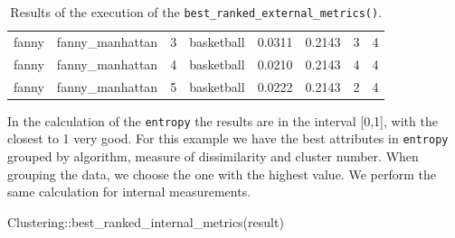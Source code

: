 \documentclass[
]{article}
\newenvironment{Shaded}{\begin{snugshade}}{\end{snugshade}}
\newcommand{\FunctionTok}[1]{\textcolor[rgb]{0.00,0.00,0.00}{#1}}
\newcommand{\NormalTok}[1]{#1}
\newcommand{\SpecialCharTok}[1]{\textcolor[rgb]{0.00,0.00,0.00}{#1}}
\begin{document}
\begin{table}[h!]
\begin{tabular}{| p{1.3cm} | p{2.1cm} | p{0.9cm} | p{1.1cm} | p{1.6cm} | p{0.8cm} | p{2.1cm} | p{1.5cm} |}
\cline{2-8}
\scriptsize fanny      & \scriptsize fanny\_manhattan & \scriptsize     3     & \scriptsize basketball  & \scriptsize     0.0311    & \scriptsize 0.2143 &  \scriptsize        3        & \scriptsize      4 \\
\scriptsize fanny      & \scriptsize fanny\_manhattan & \scriptsize     4     & \scriptsize basketball  & \scriptsize     0.0210    & \scriptsize 0.2143 &  \scriptsize        4        & \scriptsize      4 \\
\scriptsize fanny      & \scriptsize fanny\_manhattan & \scriptsize     5     & \scriptsize basketball  & \scriptsize     0.0222    & \scriptsize 0.2143 &  \scriptsize        2        & \scriptsize      4 \\
\hline
\end{tabular}
\caption{Results of the execution of the \texttt{best\_ranked\_external\_metrics()}.}
\label{tab:clusteringbestrankedexternalmetrics}
\end{table}

In the calculation of the \texttt{entropy} the results are in the
interval {[}0,1{]}, with the closest to 1 very good. For this example we
have the best attributes in \texttt{entropy} grouped by algorithm,
measure of dissimilarity and cluster number. When grouping the data, we
choose the one with the highest value. We perform the same calculation
for internal measurements.

\begin{Shaded}
\begin{Highlighting}[]
\NormalTok{Clustering}\SpecialCharTok{::}\FunctionTok{best\_ranked\_internal\_metrics}\NormalTok{(result)}
\end{Highlighting}
\end{Shaded}
\end{document}

